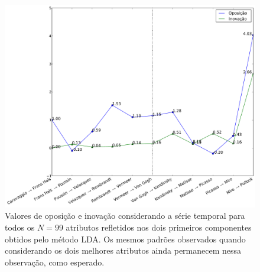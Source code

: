 \begin{figure}[h!]
\begin{center}
      \caption{Valores de oposição e inovação considerando a série temporal para
        todos os $N = 99$ atributos refletidos nos dois primeiros componentes
        obtidos pelo método LDA. Os mesmos padrões observados quando
        considerando os dois melhores atributos ainda permanecem nessa
        observação, como esperado.}
        \label{fig:caso3_oposEinov}
        \includegraphics[width=\columnwidth]{figs/caso3_oposEinov}
       \fonteminha
\end{center}
\end{figure}

